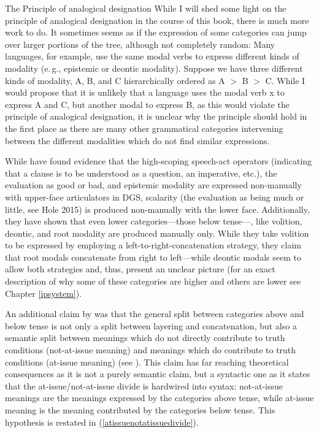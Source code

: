 \begin{savenotes}
\begin{digression}{The Principle of analogical designation}{}
While I will shed some light on the principle of analogical designation in the course of this book, there is much more work to do. It sometimes seems as if the expression of some categories can jump over larger portions of the tree, although not completely random: Many languages, for example, use the same modal verbs to express different kinds of modality (e.\,g., epistemic or deontic modality). Suppose we have three different kinds of modality, A, B, and C hierarchically ordered as A $>$ B $>$ C. While I would propose that it is unlikely that a language uses the modal verb x to express A and C, but another modal to express B, as this would violate the principle of analogical designation, it is unclear why the principle should hold in the first place as there are many other grammatical categories intervening between the different modalities which do not find similar expressions. 


\end{digression}
\end{savenotes}

\noindent While \citet{bross2017scope} have found evidence that the high-scoping speech-act operators (indicating that a clause is to be understood as a question, an imperative, etc.), the evaluation as good or bad, and epistemic modality are expressed non-manually with upper-face articulators in DGS, scalarity (the evaluation as being much or little, see Hole 2015) is produced non-manually with the lower face. Additionally, they have shown that even lower categories---those below tense---, like volition, deontic, and root modality are produced manually only. While they take volition to be expressed by employing a left-to-right-concatenation strategy, they claim that root modals concatenate from right to left---while deontic modals seem to allow both strategies and, thus, present an unclear picture (for an exact description of why some of these categories are higher and others are lower see Chapter \ref{ipsystem}).

An additional claim by \citet{bross2017scope} was that the general split between categories above and below tense is not only a split between layering and concatenation, but also a semantic split between meanings which do not directly contribute to truth conditions (not-at-issue meaning) and meanings which do contribute to truth conditions (at-issue meaning) (see \citealt{simons2010projects, tonhauser2013toward}). This claim has far reaching theoretical consequences as it is not a purely semantic claim, but a syntactic one as it states that the at-issue/not-at-issue divide is hardwired into syntax: not-at-issue meanings are the meanings expressed by the categories above tense, while at-issue meaning is the meaning contributed by the categories below tense. This hypothesis is restated in (\ref{atissuenotatissuedivide}).

